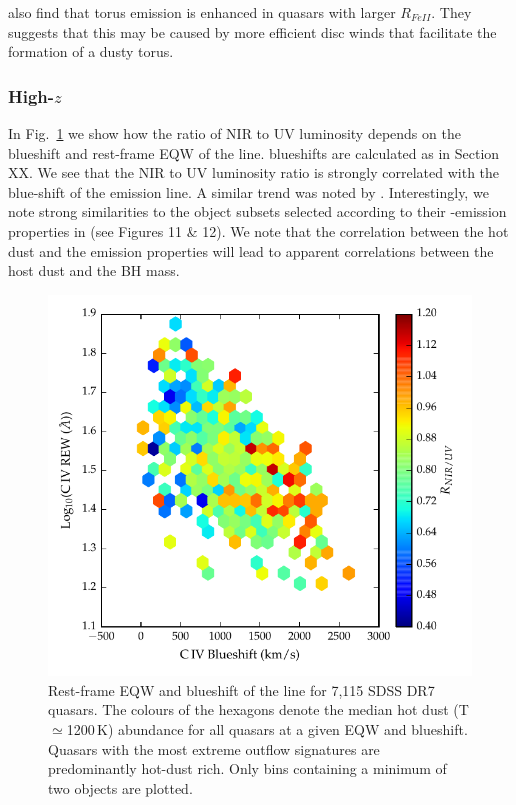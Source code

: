 \citet{shen14} also find that torus emission is enhanced in quasars with larger $R_{FeII}$.
They suggests that this may be caused by more efficient disc winds that facilitate the formation of a dusty torus. 

\subsubsection{High-$z$}

In Fig.~\ref{fig:civ_hot_dust} we show how the ratio of NIR to UV luminosity depends on the blueshift and rest-frame \ac{EQW} of the  line.
 blueshifts are calculated as in Section XX. 
We see that the NIR to UV luminosity ratio is strongly correlated with the blue-shift of the  emission line. 
A similar trend was noted by \citet{wang13}. 
Interestingly, we note strong similarities to the object subsets selected according to their -emission properties in \citet{richards11} (see Figures 11 \& 12).  
We note that the correlation between the hot dust and the  emission properties will lead to apparent correlations between the host dust and the BH mass. 
 
\begin{figure}
\centering
  \includegraphics[width=\columnwidth]{figures/chapter05/hot_dust_ratio.pdf}
  \caption{Rest-frame \ac{EQW} and blueshift of the  line for 7,115 SDSS DR7 quasars. The colours of the hexagons denote the median hot dust (T$\simeq$1200\,K) abundance for all quasars at a given \ac{EQW} and blueshift. Quasars with the most extreme outflow signatures are predominantly hot-dust rich. Only bins containing a minimum of two objects are plotted.}
  \label{fig:civ_hot_dust}
\end{figure}

